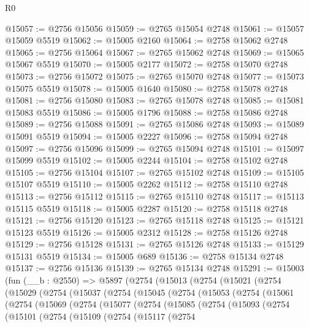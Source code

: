 \begin{lexlean}{R0}
\begin{coremodule}
@15057 := @2756 @15056
@15059 := @2765 @15054 @2748
@15061 := @15057 @15059 @5519
@15062 := @15005 @2160
@15064 := @2758 @15062 @2748
@15065 := @2756 @15064
@15067 := @2765 @15062 @2748
@15069 := @15065 @15067 @5519
@15070 := @15005 @2177
@15072 := @2758 @15070 @2748
@15073 := @2756 @15072
@15075 := @2765 @15070 @2748
@15077 := @15073 @15075 @5519
@15078 := @15005 @1640
@15080 := @2758 @15078 @2748
@15081 := @2756 @15080
@15083 := @2765 @15078 @2748
@15085 := @15081 @15083 @5519
@15086 := @15005 @1796
@15088 := @2758 @15086 @2748
@15089 := @2756 @15088
@15091 := @2765 @15086 @2748
@15093 := @15089 @15091 @5519
@15094 := @15005 @2227
@15096 := @2758 @15094 @2748
@15097 := @2756 @15096
@15099 := @2765 @15094 @2748
@15101 := @15097 @15099 @5519
@15102 := @15005 @2244
@15104 := @2758 @15102 @2748
@15105 := @2756 @15104
@15107 := @2765 @15102 @2748
@15109 := @15105 @15107 @5519
@15110 := @15005 @2262
@15112 := @2758 @15110 @2748
@15113 := @2756 @15112
@15115 := @2765 @15110 @2748
@15117 := @15113 @15115 @5519
@15118 := @15005 @2287
@15120 := @2758 @15118 @2748
@15121 := @2756 @15120
@15123 := @2765 @15118 @2748
@15125 := @15121 @15123 @5519
@15126 := @15005 @2312
@15128 := @2758 @15126 @2748
@15129 := @2756 @15128
@15131 := @2765 @15126 @2748
@15133 := @15129 @15131 @5519
@15134 := @15005 @689
@15136 := @2758 @15134 @2748
@15137 := @2756 @15136
@15139 := @2765 @15134 @2748
@15291 := @15003
    (fun (__b : @2550) =>
    @5897
      (@2754
        (@15013
          (@2754
            (@15021
              (@2754
                (@15029
                  (@2754
                    (@15037
                      (@2754
                        (@15045
                          (@2754
                            (@15053
                              (@2754
                                (@15061
                                  (@2754
                                    (@15069
                                      (@2754
                                        (@15077
                                          (@2754
                                            (@15085
                                              (@2754
                                                (@15093
                                                  (@2754
                                                    (@15101
                                                      (@2754
                                                        (@15109
                                                          (@2754
                                                            (@15117
                                                              (@2754

\end{coremodule}
\end{lexlean}
